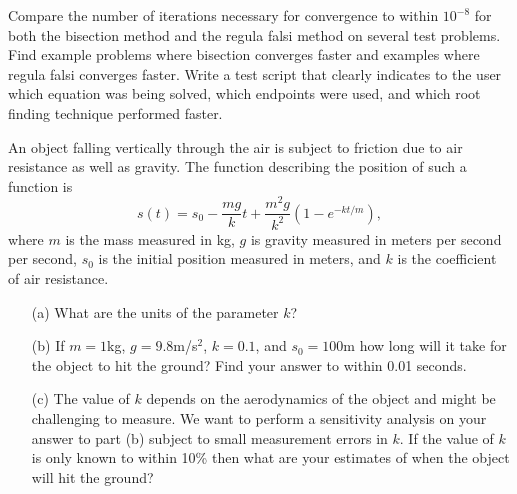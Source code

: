 \begin{problem}
    Compare the number of iterations necessary for convergence to within $10^{-8}$ for
    both the bisection method and the regula falsi method on several test problems. Find
    example problems where bisection converges faster and examples where regula falsi
    converges faster. Write a test script that clearly indicates to the user which
    equation was being solved, which endpoints were used, and which root finding technique
    performed faster.
\end{problem}

\begin{problem}
    An object falling vertically through the air is subject to friction due to air
    resistance as well as gravity.  The function describing the position of such a
    function is 
    \[ s(t) = s_0 - \frac{mg}{k} t + \frac{m^2 g}{k^2}\left( 1- e^{-kt/m} \right), \]
    where $m$ is the mass measured in kg, $g$ is gravity measured in meters per second per
    second, $s_0$ is the
    initial position measured in meters, and $k$ is the
    coefficient of air resistance.
    \begin{enumerate}
        \item[(a)] What are the units of the parameter $k$?
        \item[(b)] If $m = 1$kg, $g=9.8$m/s$^2$, $k=0.1$, and $s_0 = 100$m how long will it take
            for the object to hit the ground?  Find your answer to within 0.01 seconds.
        \item[(c)] The value of $k$ depends on the aerodynamics of the object and might be
            challenging to measure.  We want to perform a sensitivity analysis on your
            answer to part (b) subject to small measurement errors in $k$.  If the value
            of $k$ is only known to within 10\% then what are your estimates of when the
            object will hit the ground?
    \end{enumerate}
\end{problem}


